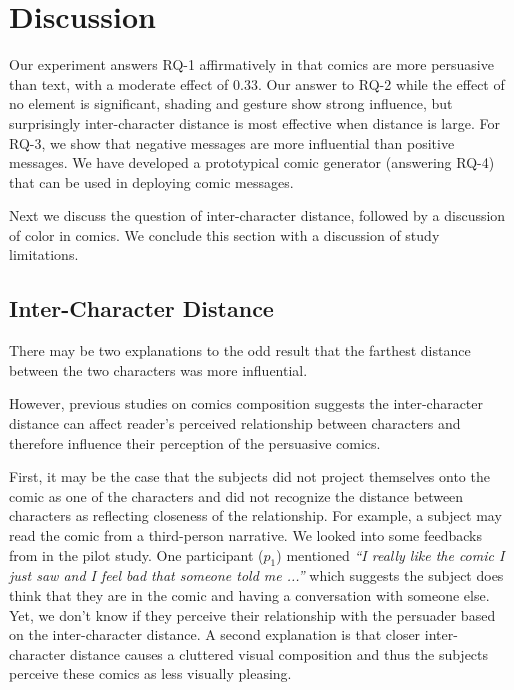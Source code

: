 \section{Discussion}
\label{sec:Discussion}
Our experiment answers RQ-1 affirmatively in that comics are more persuasive than text, with a moderate effect of 0.33. Our answer to RQ-2 while the effect of no element is significant, shading and gesture show strong influence, but surprisingly inter-character distance is most effective when distance is large. For RQ-3, we show that negative messages are more influential than positive messages. We have developed a prototypical comic generator (answering RQ-4) that can be used in deploying comic messages.

Next we discuss the question of inter-character distance, followed by a discussion of color in comics. We conclude this section with a discussion of study limitations.

%

%
\subsection{Inter-Character Distance}
\label{sub:Inter-Character Distance}
There may be two explanations to the odd result that the farthest distance between the two characters was more influential.

However, previous studies on comics composition suggests the inter-character distance can affect reader's perceived relationship between characters and therefore influence their perception of the persuasive comics.

First, it may be the case that the subjects did not project themselves onto the comic as one of the characters and did not recognize the distance between characters as reflecting closeness of the relationship. For example, a subject may read the comic from a third-person narrative. We looked into some feedbacks from in the pilot study. One participant ($p_1$) mentioned \textit{``I really like the comic I just saw and I feel bad that someone told me ...''} which suggests the subject does think that they are in the comic and having a conversation with someone else. Yet, we don't know if they perceive their relationship with the persuader based on the inter-character distance. A second explanation is that closer inter-character distance causes a cluttered visual composition and thus the subjects perceive these comics as less visually pleasing.


